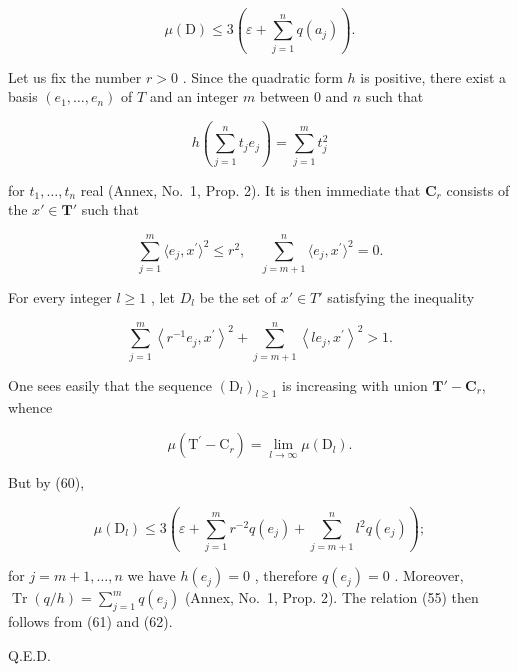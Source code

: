 \[
\mu (\mathrm{D}) \leqslant 3 \left(\varepsilon + \sum_ {j = 1} ^ {n} q (a _ {j})\right).\tag{60}
\]

Let us fix the number \(r > 0\) . Since the quadratic form \(h\) is positive, there exist a basis \((e_1, \ldots, e_n)\) of \(T\) and an integer \(m\) between 0 and \(n\) such that

\[
h \left(\sum_ {j = 1} ^ {n} t _ {j} e _ {j}\right) = \sum_ {j = 1} ^ {m} t _ {j} ^ {2}
\]

for \(t_1, \ldots, t_n\) real (Annex, No.~1, Prop. 2). It is then immediate that \(\mathbf{C}_r\) consists of the \(x' \in \mathbf{T}'\) such that

\[
\sum_ {j = 1} ^ {m} \langle e _ {j}, x ^ {\prime} \rangle^ {2} \leqslant r ^ {2}, \quad \sum_ {j = m + 1} ^ {n} \langle e _ {j}, x ^ {\prime} \rangle^ {2} = 0.
\]

For every integer \(l \geqslant 1\) , let \(D_l\) be the set of \(x' \in T'\) satisfying the inequality

\[
\sum_ {j = 1} ^ {m} \left\langle r ^ {- 1} e _ {j}, x ^ {\prime} \right\rangle^ {2} + \sum_ {j = m + 1} ^ {n} \left\langle l e _ {j}, x ^ {\prime} \right\rangle^ {2} > 1.
\]

One sees easily that the sequence \((\mathrm{D}_l)_{l\geqslant 1}\) is increasing with union \(\mathbf{T}' - \mathbf{C}_r\), whence

\[
\mu (\mathrm{T} ^ {\prime} - \mathrm{C} _ {r}) = \lim _ {l \to \infty} \mu (\mathrm{D} _ {l}).\tag{61}
\]

But by (60),

\[
\mu \left(\mathrm{D} _ {l}\right) \leqslant 3 \left(\varepsilon + \sum_ {j = 1} ^ {m} r ^ {- 2} q \left(e _ {j}\right) + \sum_ {j = m + 1} ^ {n} l ^ {2} q \left(e _ {j}\right)\right);\tag{62}
\]

for \(j = m + 1, \ldots, n\) we have \(h(e_j) = 0\) , therefore \(q(e_j) = 0\) . Moreover, \(\operatorname{Tr}(q/h) = \sum_{j=1}^{m} q(e_j)\) (Annex, No.~1, Prop. 2). The relation (55) then follows from (61) and (62).

Q.E.D.

